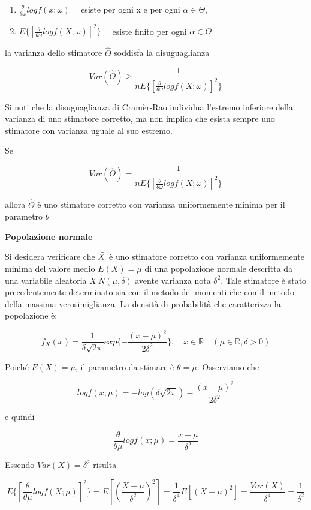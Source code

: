 \begin{enumerate}
    \item $\frac{\theta}{\theta \omega} log f(x;\omega) \quad$ esiste per ogni x e per ogni $\alpha \in \Theta,$
    \item $E\{[\frac{\theta}{\theta \omega} log f(X;\omega)]^2\} \quad$ esiste finito per ogni $\alpha \in \Theta$
\end{enumerate}

la varianza dello stimatore $\hat{\Theta}$ soddisfa la disuguaglianza

\[Var(\hat{\Theta}) \geq \frac{1}{nE\{[\frac{\theta}{\theta \omega} log f(X;\omega)]^2\}}\]

Si noti che la disuguaglianza di Cramèr-Rao individua l'estremo inferiore della varianza di uno stimatore corretto, ma non implica che esista sempre uno stimatore con varianza uguale al suo estremo.

Se 

\[Var(\hat{\Theta}) = \frac{1}{nE\{[\frac{\theta}{\theta \omega} log f(X;\omega)]^2\}}\]

allora $\hat{\Theta}$ è uno stimatore corretto con varianza uniformemente minima per il parametro $\theta$

\vspace{5mm}
\noindent \textbf{Popolazione normale}

Si desidera verificare che $\Bar{X}$ è uno stimatore corretto con varianza uniformemente minima del valore medio $E(X) = \mu$ di una popolazione normale descritta da una variabile aleatoria $X ~ N (\mu, \delta)$ avente varianza nota $\delta^2$. Tale stimatore è stato precedentemente determinato sia con il metodo dei momenti che con il metodo della massima verosimiglianza. La densità di probabilità che caratterizza la popolazione è:

\[f_X(x) = \frac{1}{\delta \sqrt{2\pi}} exp\{-\frac{(x - \mu)^2}{2\delta^2}\}, \quad x \in \mathbb{R} \quad (\mu \in \mathbb{R}, \delta > 0)\]

Poiché $E(X) = \mu$, il parametro da stimare è $\theta = \mu$. Osserviamo che

\[log f(x;\mu) = -log(\delta \sqrt{2\pi}) - \frac{(x - \mu)^2}{2\delta^2}\]

e quindi

\[\frac{\theta}{\theta \mu} log f(x;\mu) = \frac{x - \mu}{\delta^2}\]

Essendo $Var(X) = \delta^2$ risulta

\[E\{[\frac{\theta}{\theta \mu} log f(X;\mu)]^2\} = E[(\frac{X-\mu}{\delta^2})^2] = \frac{1}{\delta^4}E[(X - \mu)^2] = \frac{Var(X)}{\delta^4} = \frac{1}{\delta^2}\]

